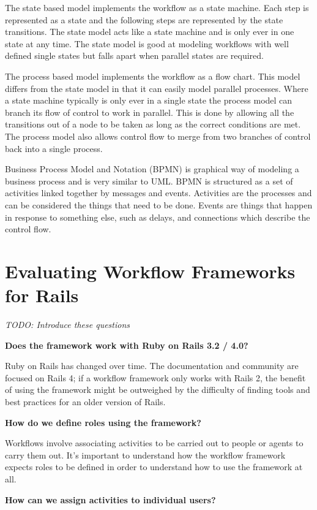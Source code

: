 \documentclass[12pt]{report}
\makeatletter
\def\sectionnote#1{\def\@sectionnote{#1}}%
\let\@sectionnote\@empty%
\newcommand{\todo}[1] {\textit{TODO: #1}}
\newcommand{\question}[1] {\vspace{3mm} \noindent \textbf{#1}}
\makeatother
\begin{document}
The state based model implements the workflow as a state machine. Each step is represented as a state and the following steps are represented by the state transitions. The state model acts like a state machine and is only ever in one state at any time. The state model is good at modeling workflows with well defined single states but falls apart when parallel states are required.

The process based model implements the workflow as a flow chart. This model differs from the state model in that it can easily model parallel processes. Where a state machine typically is only ever in a single state the process model can branch its flow of control to work in parallel. This is done by allowing all the transitions out of a node to be taken as long as the correct conditions are met. The process model also allows control flow to merge from two branches of control back into a single process.

Business Process Model and Notation (BPMN) is graphical way of modeling a business process and is very similar to UML. BPMN is structured as a set of activities linked together by messages and events. Activities are the processes and can be considered the things that need to be done. Events are things that happen in response to something else, such as delays, and connections which describe the control flow.


\sectionnote{BM}
\section {Evaluating Workflow Frameworks for Rails}

\todo{Introduce these questions}

\question{Does the framework work with Ruby on Rails 3.2 / 4.0?}

Ruby on Rails has changed over time. The documentation and community are focused on Rails 4; if a workflow framework only works with Rails 2, the benefit of using the framework might be outweighed by the difficulty of finding tools and best practices for an older version of Rails.

\question{How do we define roles using the framework?}

Workflows involve associating activities to be carried out to people or agents to carry them out. It’s important to understand how the workflow framework expects roles to be defined in order to understand how to use the framework at all.

\question{How can we assign activities to individual users?}
\end{document}
